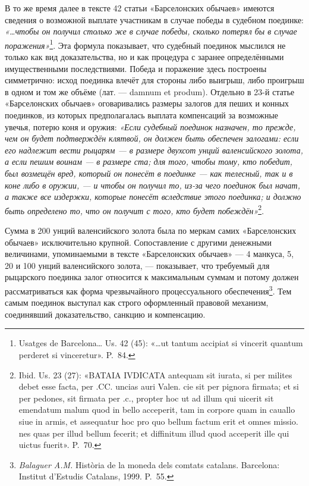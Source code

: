 В то же время далее в тексте 42 статьи «Барселонских обычаев» имеются сведения о возможной выплате участникам в случае победы в судебном поединке: \emph{«…чтобы он получил столько же в случае победы, сколько потерял бы в случае поражения»}\footnote{Usatges de Barcelona… Us. 42 (45): «…ut tantum accipiat si vincerit quantum perderet si vinceretur». P.~84.}. Эта формула показывает, что судебный поединок мыслился не только как вид доказательства, но и как процедура с заранее определёнными имущественными последствиями. Победа и поражение здесь построены симметрично: исход поединка влечёт для стороны либо выигрыш, либо проигрыш в одном и том же объёме (лат. --- damnum et produm). Отдельно в 23-й статье «Барселонских обычаев» оговаривались размеры залогов для пеших и конных поединков, из которых предполагалась выплата компенсаций за возможные увечья, потерю коня и оружия: \emph{«Если судебный поединок назначен, то прежде, чем он будет подтверждён клятвой, он должен быть обеспечен залогами: если его надлежит вести рыцарям --- в размере двухсот унций валенсийского золота, а если пешим воинам --- в размере ста; для того, чтобы тому, кто победит, был возмещён вред, который он понесёт в поединке --- как телесный, так и в коне либо в оружии, --- и чтобы он получил то, из-за чего поединок был начат, а также все издержки, которые понесёт вследствие этого поединка; и должно быть определено то, что он получит с того, кто будет побеждён»}\footnote{Ibid. Us. 23 (27): «BATAIA IVDICATA antequam sit iurata, si per milites debet esse facta, per .CC. uncias auri Valen. cie sit per pignora firmata; et si per pedones, sit firmata per .c., propter hoc ut ad illum qui uicerit sit emendatum malum quod in bello acceperit, tam in corpore quam in cauallo siue in armis, et assequatur hoc pro quo bellum factum erit et omnes missio. nes quas per illud bellum fecerit; et diffinitum illud quod acceperit ille qui uictus fuerit». P.~70.}.

Сумма в 200 унций валенсийского золота была по меркам самих «Барселонских обычаев» исключительно крупной. Сопоставление с другими денежными величинами, упоминаемыми в тексте\emph{ }«Барселонских обычаев» --- 4 манкуса, 5, 20 и 100 унций валенсийского золота, --- показывает, что требуемый для рыцарского поединка залог относится к максимальным суммам и потому должен рассматриваться как форма чрезвычайного процессуального обеспечения\footnote{\emph{ Balaguer A.M. }Història de la moneda dels comtats catalans. Barcelona: Institut d’Estudis Catalans, 1999. P.~55.}. Тем самым поединок выступал как строго оформленный правовой механизм, соединявший доказательство, санкцию и компенсацию.

